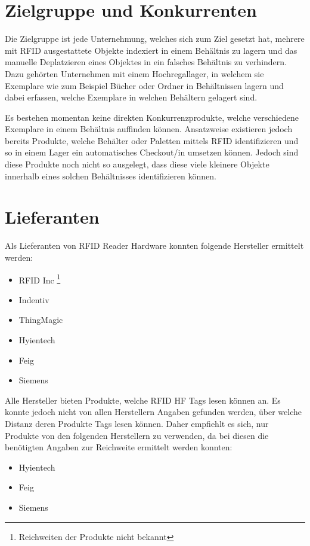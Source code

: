 \section{Zielgruppe und Konkurrenten}
Die Zielgruppe ist jede Unternehmung, welches sich zum Ziel gesetzt hat, mehrere mit RFID ausgestattete Objekte indexiert in einem Behältnis zu lagern und das manuelle Deplatzieren eines Objektes in ein falsches Behältnis zu verhindern.
Dazu gehörten Unternehmen mit einem Hochregallager, in welchem sie Exemplare wie zum Beispiel Bücher oder Ordner in Behältnissen lagern und dabei erfassen, welche Exemplare in welchen Behältern gelagert sind.

Es bestehen momentan keine direkten Konkurrenzprodukte, welche verschiedene Exemplare in einem Behältnis auffinden können. Ansatzweise existieren jedoch bereits Produkte, welche  Behälter oder Paletten mittels RFID identifizieren und so in einem Lager ein automatisches Checkout/in umsetzen können. Jedoch sind diese Produkte noch nicht so ausgelegt, dass diese viele kleinere Objekte innerhalb eines solchen Behältnisses identifizieren können.

\section{Lieferanten}
Als Lieferanten von RFID Reader Hardware konnten folgende Hersteller ermittelt werden:
\renewcommand*{\thefootnote}{\fnsymbol{footnote}}
\begin{itemize}
	\item RFID Inc \footnote[1]{\label{note:range_unknown}Reichweiten der Produkte nicht bekannt}
	\item Indentiv \hyperref[note:range_unknown]{\footnotemark[1]}
	\item ThingMagic \hyperref[note:range_unknown]{\footnotemark[1]}
	\item Hyientech
	\item Feig
	\item Siemens
\end{itemize}
\renewcommand*{\thefootnote}{\arabic{footnote}}

Alle Hersteller bieten Produkte, welche RFID HF Tags lesen können an. Es konnte jedoch nicht von allen Herstellern Angaben gefunden werden, über welche Distanz deren Produkte Tags lesen können. Daher empfiehlt es sich, nur Produkte von den folgenden Herstellern zu verwenden, da bei diesen die benötigten Angaben zur Reichweite ermittelt werden konnten:

\begin{itemize}
	\item Hyientech
	\item Feig
	\item Siemens
\end{itemize}

